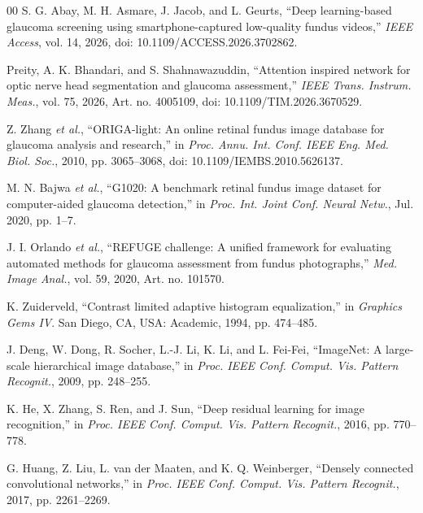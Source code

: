 \documentclass[journal,twoside,web]{ieeecolor}
\begin{document}
\begin{thebibliography}{00}
S. G. Abay, M. H. Asmare, J. Jacob, and L. Geurts, ``Deep learning-based glaucoma screening using smartphone-captured low-quality fundus videos,'' \emph{IEEE Access}, vol. 14, 2026, doi: 10.1109/ACCESS.2026.3702862.

Preity, A. K. Bhandari, and S. Shahnawazuddin, ``Attention inspired network for optic nerve head segmentation and glaucoma assessment,'' \emph{IEEE Trans. Instrum. Meas.}, vol. 75, 2026, Art. no. 4005109, doi: 10.1109/TIM.2026.3670529.

Z. Zhang \emph{et al.}, ``ORIGA-light: An online retinal fundus image database for glaucoma analysis and research,'' in \emph{Proc. Annu. Int. Conf. IEEE Eng. Med. Biol. Soc.}, 2010, pp. 3065--3068, doi: 10.1109/IEMBS.2010.5626137.

M. N. Bajwa \emph{et al.}, ``G1020: A benchmark retinal fundus image dataset for computer-aided glaucoma detection,'' in \emph{Proc. Int. Joint Conf. Neural Netw.}, Jul. 2020, pp. 1--7.

J. I. Orlando \emph{et al.}, ``REFUGE challenge: A unified framework for evaluating automated methods for glaucoma assessment from fundus photographs,'' \emph{Med. Image Anal.}, vol. 59, 2020, Art. no. 101570.

K. Zuiderveld, ``Contrast limited adaptive histogram equalization,'' in \emph{Graphics Gems IV}. San Diego, CA, USA: Academic, 1994, pp. 474--485.

J. Deng, W. Dong, R. Socher, L.-J. Li, K. Li, and L. Fei-Fei, ``ImageNet: A large-scale hierarchical image database,'' in \emph{Proc. IEEE Conf. Comput. Vis. Pattern Recognit.}, 2009, pp. 248--255.

K. He, X. Zhang, S. Ren, and J. Sun, ``Deep residual learning for image recognition,'' in \emph{Proc. IEEE Conf. Comput. Vis. Pattern Recognit.}, 2016, pp. 770--778.

G. Huang, Z. Liu, L. van der Maaten, and K. Q. Weinberger, ``Densely connected convolutional networks,'' in \emph{Proc. IEEE Conf. Comput. Vis. Pattern Recognit.}, 2017, pp. 2261--2269.


\end{thebibliography}
\end{document}
